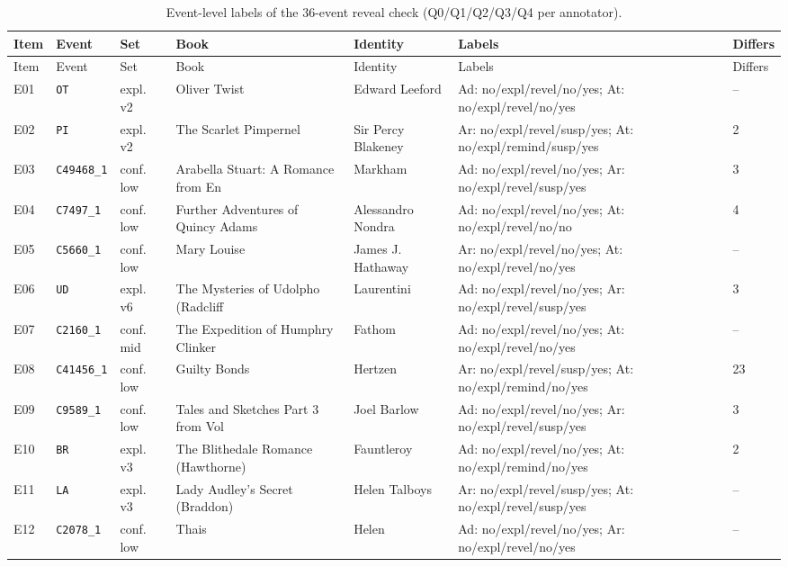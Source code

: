 \documentclass[11pt]{article}
\begin{document}
{\scriptsize\begin{longtable}{p{0.6cm}p{1.4cm}p{1.1cm}p{3.1cm}p{2.0cm}p{4.6cm}p{0.8cm}}
\caption{Event-level labels of the 36-event reveal check (Q0/Q1/Q2/Q3/Q4 per annotator).}\label{tab:s-reveal-labels}\\
\toprule Item & Event & Set & Book & Identity & Labels & Differs \\ \midrule \endfirsthead \toprule Item & Event & Set & Book & Identity & Labels & Differs \\ \midrule \endhead
E01 & \texttt{OT} & expl. v2 & Oliver Twist & Edward Leeford & Ad: no/expl/revel/no/yes; At: no/expl/revel/no/yes & -- \\
E02 & \texttt{PI} & expl. v2 & The Scarlet Pimpernel & Sir Percy Blakeney & Ar: no/expl/revel/susp/yes; At: no/expl/remind/susp/yes & 2 \\
E03 & \texttt{C49468\_1} & conf. low & Arabella Stuart: A Romance from En & Markham & Ad: no/expl/revel/no/yes; Ar: no/expl/revel/susp/yes & 3 \\
E04 & \texttt{C7497\_1} & conf. low & Further Adventures of Quincy Adams & Alessandro Nondra & Ad: no/expl/revel/no/yes; At: no/expl/revel/no/no & 4 \\
E05 & \texttt{C5660\_1} & conf. low & Mary Louise & James J. Hathaway & Ar: no/expl/revel/no/yes; At: no/expl/revel/no/yes & -- \\
E06 & \texttt{UD} & expl. v6 & The Mysteries of Udolpho (Radcliff & Laurentini & Ad: no/expl/revel/no/yes; Ar: no/expl/revel/susp/yes & 3 \\
E07 & \texttt{C2160\_1} & conf. mid & The Expedition of Humphry Clinker & Fathom & Ad: no/expl/revel/no/yes; At: no/expl/revel/no/yes & -- \\
E08 & \texttt{C41456\_1} & conf. low & Guilty Bonds & Hertzen & Ar: no/expl/revel/susp/yes; At: no/expl/remind/no/yes & 23 \\
E09 & \texttt{C9589\_1} & conf. low & Tales and Sketches Part 3 from Vol & Joel Barlow & Ad: no/expl/revel/no/yes; Ar: no/expl/revel/susp/yes & 3 \\
E10 & \texttt{BR} & expl. v3 & The Blithedale Romance (Hawthorne) & Fauntleroy & Ad: no/expl/revel/no/yes; At: no/expl/remind/no/yes & 2 \\
E11 & \texttt{LA} & expl. v3 & Lady Audley's Secret (Braddon) & Helen Talboys & Ar: no/expl/revel/susp/yes; At: no/expl/revel/susp/yes & -- \\
E12 & \texttt{C2078\_1} & conf. low & Thais & Helen & Ad: no/expl/revel/no/yes; Ar: no/expl/revel/no/yes & -- \\

\end{longtable}}
\end{document}
